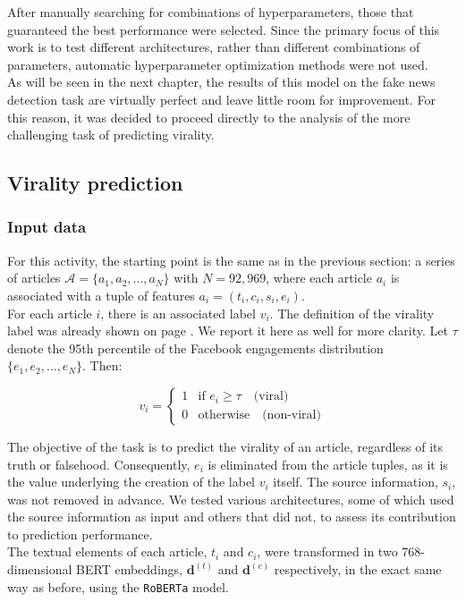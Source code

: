 \documentclass[a4paper,twoside,12pt]{book}
\begin{document}
After manually searching for combinations of hyperparameters, those that guaranteed the best performance were selected. Since the primary focus of this work is to test different architectures, rather than different combinations of parameters, automatic hyperparameter optimization methods were not used. \\

As will be seen in the next chapter, the results of this model on the fake news detection task are virtually perfect and leave little room for improvement. For this reason, it was decided to proceed directly to the analysis of the more challenging task of predicting virality.

\subsection*{Virality prediction}

\subsubsection*{Input data}
For this activity, the starting point is the same as in the previous section: a series of articles $\mathcal{A} = \{ a_1, a_2, \dots, a_N \}$ with $N = 92{,}969$, where each article $a_i$ is associated with a tuple of features $a_i = (t_i, c_i, s_i, e_i)$. \\

For each article $i$, there is an associated label $v_i$. The definition of the virality label was already shown on page \pageref{evons_processing}. We report it here as well for more clarity. Let $\tau$ denote the 95th percentile of the Facebook engagements distribution $\{ e_1, e_2, \dots, e_N \}$. Then:

$$
v_i = 
\begin{cases}
	1 & \text{if } e_i \geq \tau \quad \text{(viral)} \\
	0 & \text{otherwise} \quad \text{(non-viral)}
\end{cases}
$$  

The objective of the task is  to predict the virality of an article, regardless of its truth or falsehood. Consequently, $e_i$ is eliminated from the article tuples, as it is the value underlying the creation of the label $v_i$ itself. The source information, $s_i$, was not removed in advance. We tested various architectures, some of which used the source information as input and others that did not, to assess its contribution to prediction performance. \\
The textual elements of each article, $t_i$ and $c_i$, were transformed in two 768-dimensional BERT embeddings, $\mathbf{d}^{(t)}$ and $\mathbf{d}^{(c)}$ respectively, in the exact same way as before, using the \texttt{RoBERTa} model.
\end{document}
